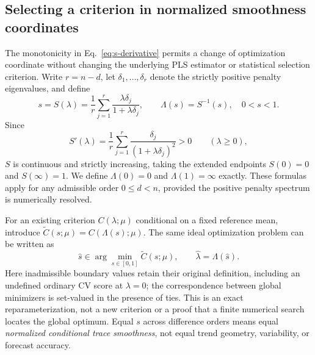 \subsection{Selecting a criterion in normalized smoothness coordinates}
\label{sec:smoothness-coordinate-search}
The monotonicity in Eq.~\eqref{eq:s-derivative} permits a change of
optimization coordinate without changing the underlying PLS estimator
or statistical selection criterion. Write $r=n-d$, let
$\delta_1,\ldots,\delta_r$ denote the strictly positive penalty
eigenvalues, and define
\begin{equation}\label{eq:inverse-s-coordinate}
s=S(\lambda)
=\frac{1}{r}\sum_{j=1}^{r}
\frac{\lambda\delta_j}{1+\lambda\delta_j},
\qquad
\Lambda(s)=S^{-1}(s),\quad 0<s<1.
\end{equation}
Since
\begin{equation}\label{eq:s-coordinate-derivative}
S'(\lambda)=\frac1r\sum_{j=1}^{r}
\frac{\delta_j}{(1+\lambda\delta_j)^2}>0
\qquad (\lambda\ge0),
\end{equation}
$S$ is continuous and strictly increasing, taking the extended
endpoints $S(0)=0$ and $S(\infty)=1$. We define
$\Lambda(0)=0$ and $\Lambda(1)=\infty$ exactly. These formulas
apply for any admissible order $0\le d<n$, provided the positive
penalty spectrum is numerically resolved.

For an existing criterion $C(\lambda;\mu)$ conditional on a fixed
reference mean, introduce $\widetilde C(s;\mu)=C(\Lambda(s);\mu)$.
The same ideal optimization problem can be written as
\begin{equation}\label{eq:criterion-s-coordinate}
\widehat s\in\arg\min_{s\in[0,1]}
\widetilde C(s;\mu),
\qquad
\widehat\lambda=\Lambda(\widehat s).
\end{equation}
Here inadmissible boundary values retain their original definition,
including an undefined ordinary CV score at $\lambda=0$; the
correspondence between global minimizers is set-valued in the
presence of ties. This is an exact reparameterization, not a new
criterion or a proof that a finite numerical search locates the
global optimum. Equal $s$ across difference orders means equal
\emph{normalized conditional trace smoothness}, not equal trend
geometry, variability, or forecast accuracy.

